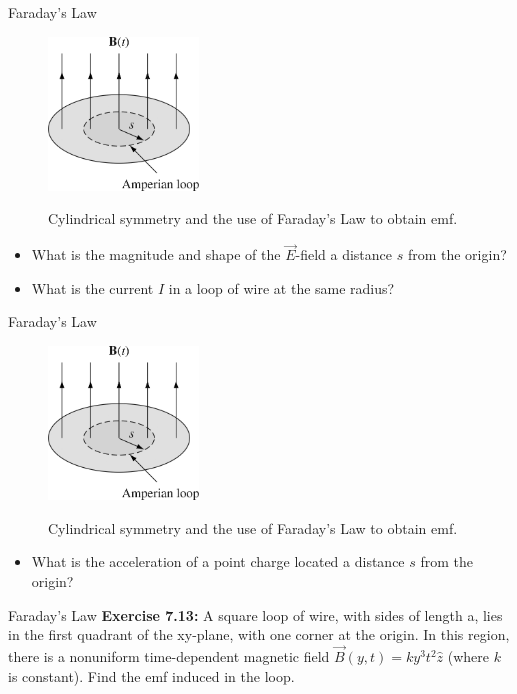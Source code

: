 \documentclass{beamer}
\begin{document}
\begin{frame}{Faraday's Law}
\begin{figure}
\centering
\includegraphics[width=4cm]{figures/7_25.jpg} \\
\caption{\label{fig:far1} Cylindrical symmetry and the use of Faraday's Law to obtain emf.}
\end{figure}
\begin{itemize}
\item What is the magnitude and shape of the $\vec{E}$-field a distance $s$ from the origin?
\item What is the current $I$ in a loop of wire at the same radius?
\end{itemize}
\end{frame}

\begin{frame}{Faraday's Law}
\begin{figure}
\centering
\includegraphics[width=4cm]{figures/7_25.jpg} \\
\caption{\label{fig:far1} Cylindrical symmetry and the use of Faraday's Law to obtain emf.}
\end{figure}
\begin{itemize}
\item What is the acceleration of a point charge located a distance $s$ from the origin?
\end{itemize}
\end{frame}

\begin{frame}{Faraday's Law}
\textbf{Exercise 7.13:} A square loop of wire, with sides of length a, lies in the first quadrant of the xy-plane, with one corner at the origin.  In this region, there is a nonuniform time-dependent magnetic field $\vec{B}(y,t) = k y^3 t^2 \hat{z}$ (where $k$ is constant).  Find the emf induced in the loop. \\ \vspace{6cm}
\end{frame}
\end{document}
